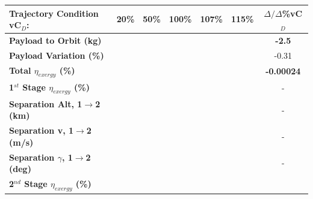 \begin{table}[ht]
	\centering
	\begin{tabular}{l c c c c c c} 
		\hline \textbf{Trajectory Condition} \qquad vC$_D$:
		&20\%
		&50\%
		&100\%
		&107\%
		&115\%
		& $\Delta/\Delta$\%vC$_D$
		\\
		\hline \textbf{Payload to Orbit (kg)}
		& \textbf{\PayloadToOrbitvCdTwenty}
		& \textbf{\PayloadToOrbitvCdFifty}
		& \textbf{\PayloadToOrbitvCdStandard}
		& \textbf{\PayloadToOrbitvCdOneHundredSeven}
		& \textbf{\PayloadToOrbitvCdOneHundredFifteen}
		&\textbf{-2.5}
		\\
		\textbf{Payload Variation (\%)}
		& \PayloadVarvCdTwenty
		& \PayloadVarvCdFifty
		& \PayloadVarvCdStandard
		& \PayloadVarvCdOneHundredSeven
		& \PayloadVarvCdOneHundredFifteen
		&-0.31
		\\
		\textbf{Total $\eta_{exergy}$ (\%)}
		& \textbf{\totalExergyEffvCdTwenty}
		& \textbf{\totalExergyEffvCdFifty}
		& \textbf{\totalExergyEffvCdStandard}
		& \textbf{\totalExergyEffvCdOneHundredSeven}
		& \textbf{\totalExergyEffvCdOneHundredFifteen}
		& \textbf{-0.00024}
		\\
		\hline 
		\textbf{1$^{st}$ Stage $\eta_{exergy}$ (\%)}
		& \textbf{\firstExergyEffvCdTwenty}
		& \textbf{\firstExergyEffvCdFifty}
		& \textbf{\firstExergyEffvCdStandard}
		& \textbf{\firstExergyEffvCdOneHundredSeven}
		& \textbf{\firstExergyEffvCdOneHundredFifteen}
		& -
		\\
		\textbf{Separation Alt, 1$\rightarrow$2 (km)}
		& \firstsecondSeparationAltvCdTwenty
		& \firstsecondSeparationAltvCdFifty
		& \firstsecondSeparationAltvCdStandard
		& \firstsecondSeparationAltvCdOneHundredSeven
		& \firstsecondSeparationAltvCdOneHundredFifteen
		& -
		\\
		\textbf{Separation v, 1$\rightarrow$2 (m/s)}
		& \firstsecondSeparationvvCdTwenty
		& \firstsecondSeparationvvCdFifty
		& \firstsecondSeparationvvCdStandard
		& \firstsecondSeparationvvCdOneHundredSeven
		& \firstsecondSeparationvvCdOneHundredFifteen
		& -
		\\
		\textbf{Separation $\gamma$, 1$\rightarrow$2 (deg)}
		& \firstsecondSeparationgammavCdTwenty
		& \firstsecondSeparationgammavCdFifty
		& \firstsecondSeparationgammavCdStandard
		& \firstsecondSeparationgammavCdOneHundredSeven
		& \firstsecondSeparationgammavCdOneHundredFifteen
		& -
		\\
		\hline 
		\textbf{2$^{nd}$ Stage $\eta_{exergy}$ (\%)}
		& \textbf{\secondExergyEffvCdTwenty}
		& \textbf{\secondExergyEffvCdFifty}
		& \textbf{\secondExergyEffvCdStandard}

\end{tabular}
\end{table}
